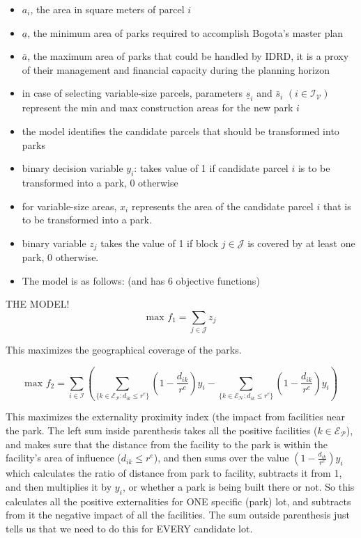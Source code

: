 \documentclass{article}
\begin{document}
\begin{itemize}
\item $a_i$, the area in square meters of parcel $i$
\item $\underline{a}$, the minimum area of parks required to accomplish Bogota's master plan
\item $\bar{a}$, the maximum area of parks that could be handled by IDRD, it is a proxy of their management and financial capacity during the planning horizon
\item in case of selecting variable-size parcels, parameters $\underline{s}_i$ and $\bar{s}_i$ $(i \in \mathcal{I_V})$ represent the min and max construction areas for the new park $i$
\item the model identifies the candidate parcels that should be transformed into parks
\item binary decision variable $y_i$: takes value of 1 if candidate parcel $i$ is to be transformed into a park, 0 otherwise
\item for variable-size areas, $x_i$ represents the area of the candidate parcel $i$ that is to be transformed into a park.
\item binary variable $z_j$ takes the value of 1 if block $j \in \mathcal{J}$  is covered by at least one park, 0 otherwise.
\item The model is as follows: (and has 6 objective functions) \newline
\end{itemize} 
{\large THE MODEL!}
\begin{equation}
\textrm{max } f_1 = \sum_{j \in \mathcal{J}} z_j
\end{equation}

This maximizes the geographical coverage of the parks.

\begin{equation}
\textrm{max } f_2 = \sum_{i \in \mathcal{I}}  \left( \sum_{\{k \in \mathcal{E_P}: d_{ik} \leq r^e  \}} \left( 1-\frac{d_{ik}}{r^e} \right) y_i  -   \sum_{\{k \in \mathcal{E_N}: d_{ik} \leq r^e  \}} \left( 1-\frac{d_{ik}}{r^e} \right) y_i   \right)
\end{equation}

This maximizes the externality proximity index (the impact from facilities near the park. 
The left sum inside parenthesis takes all the positive facilities ($k \in \mathcal{E_P}$), and makes sure that the distance from the facility to the park is within the facility's area of influence ($d_{ik} \leq r^e$), and then sums over the value $\left( 1 - \frac{d_{ik}}{r^e} \right)y_i$ which calculates the ratio of distance from park to facility, subtracts it from 1, and then multiplies it by $y_i$, or whether a park is being built there or not. So this calculates all the positive externalities for ONE specific (park) lot, and subtracts from it the negative impact of all the facilities. The sum outside parenthesis just tells us that we need to do this for EVERY candidate lot.
\end{document}
